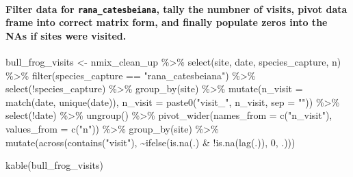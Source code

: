 \documentclass[
  letterpaper,
  DIV=11,
  numbers=noendperiod]{scrartcl}
\let\oldparagraph\paragraph
\renewcommand{\paragraph}[1]{\oldparagraph{#1}\mbox{}}
\newenvironment{Shaded}{\begin{snugshade}}{\end{snugshade}}
\newcommand{\AttributeTok}[1]{\textcolor[rgb]{0.40,0.45,0.13}{#1}}
\newcommand{\DecValTok}[1]{\textcolor[rgb]{0.68,0.00,0.00}{#1}}
\newcommand{\FunctionTok}[1]{\textcolor[rgb]{0.28,0.35,0.67}{#1}}
\newcommand{\NormalTok}[1]{\textcolor[rgb]{0.00,0.23,0.31}{#1}}
\newcommand{\OtherTok}[1]{\textcolor[rgb]{0.00,0.23,0.31}{#1}}
\newcommand{\SpecialCharTok}[1]{\textcolor[rgb]{0.37,0.37,0.37}{#1}}
\newcommand{\StringTok}[1]{\textcolor[rgb]{0.13,0.47,0.30}{#1}}
\begin{document}
\hypertarget{filter-data-for-rana_catesbeiana-tally-the-numbner-of-visits-pivot-data-frame-into-correct-matrix-form-and-finally-populate-zeros-into-the-nas-if-sites-were-visited.}{%
\paragraph{\texorpdfstring{Filter data for \texttt{rana\_catesbeiana},
tally the numbner of visits, pivot data frame into correct matrix form,
and finally populate zeros into the NAs if sites were
visited.}{Filter data for rana\_catesbeiana, tally the numbner of visits, pivot data frame into correct matrix form, and finally populate zeros into the NAs if sites were visited.}}\label{filter-data-for-rana_catesbeiana-tally-the-numbner-of-visits-pivot-data-frame-into-correct-matrix-form-and-finally-populate-zeros-into-the-nas-if-sites-were-visited.}}

\begin{Shaded}
\begin{Highlighting}[]
\NormalTok{bull\_frog\_visits }\OtherTok{\textless{}{-}}\NormalTok{ nmix\_clean\_up }\SpecialCharTok{\%\textgreater{}\%} 
  \FunctionTok{select}\NormalTok{(site, date, species\_capture, n) }\SpecialCharTok{\%\textgreater{}\%} 
  \FunctionTok{filter}\NormalTok{(species\_capture }\SpecialCharTok{==} \StringTok{"rana\_catesbeiana"}\NormalTok{) }\SpecialCharTok{\%\textgreater{}\%} 
  \FunctionTok{select}\NormalTok{(}\SpecialCharTok{!}\NormalTok{species\_capture) }\SpecialCharTok{\%\textgreater{}\%} 
  \FunctionTok{group\_by}\NormalTok{(site) }\SpecialCharTok{\%\textgreater{}\%} 
  \FunctionTok{mutate}\NormalTok{(}\AttributeTok{n\_visit =} \FunctionTok{match}\NormalTok{(date, }\FunctionTok{unique}\NormalTok{(date)),}
         \AttributeTok{n\_visit =} \FunctionTok{paste0}\NormalTok{(}\StringTok{"visit\_"}\NormalTok{, n\_visit, }\AttributeTok{sep =} \StringTok{""}\NormalTok{)) }\SpecialCharTok{\%\textgreater{}\%} 
  \FunctionTok{select}\NormalTok{(}\SpecialCharTok{!}\NormalTok{date) }\SpecialCharTok{\%\textgreater{}\%} 
  \FunctionTok{ungroup}\NormalTok{() }\SpecialCharTok{\%\textgreater{}\%}
  \FunctionTok{pivot\_wider}\NormalTok{(}\AttributeTok{names\_from =} \FunctionTok{c}\NormalTok{(}\StringTok{"n\_visit"}\NormalTok{), }\AttributeTok{values\_from =} \FunctionTok{c}\NormalTok{(}\StringTok{"n"}\NormalTok{)) }\SpecialCharTok{\%\textgreater{}\%} 
  \FunctionTok{group\_by}\NormalTok{(site) }\SpecialCharTok{\%\textgreater{}\%} 
  \FunctionTok{mutate}\NormalTok{(}\FunctionTok{across}\NormalTok{(}\FunctionTok{contains}\NormalTok{(}\StringTok{"visit"}\NormalTok{), }
                \SpecialCharTok{\textasciitilde{}}\FunctionTok{ifelse}\NormalTok{(}\FunctionTok{is.na}\NormalTok{(.) }\SpecialCharTok{\&}
                          \SpecialCharTok{!}\FunctionTok{is.na}\NormalTok{(}\FunctionTok{lag}\NormalTok{(.)), }\DecValTok{0}\NormalTok{, .)))}



\FunctionTok{kable}\NormalTok{(bull\_frog\_visits)}
\end{Highlighting}
\end{Shaded}
\end{document}
